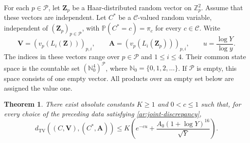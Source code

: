 \documentclass[twoside]{aomart}
\theoremstyle{paperplain}
\newtheorem{theorem}{Theorem}[section]
\theoremstyle{paperdefinition}
\newcommand{\Z}{\mathbb Z}
\newcommand{\N}{\mathbb N}
\newcommand{\Pp}{\mathbb P}
\newcommand{\TV}{d_{\mathrm{TV}}}
\numberwithin{equation}{section}
\begin{document}
For each $p\in\mathcal P$, let $\mathbf Z_p$ be a
Haar-distributed random vector on $\Z_p^2$.
Assume that these vectors are independent.
Let $C^*$ be a $\mathcal C$-valued random variable, independent
of $(\mathbf Z_p)_{p\in\mathcal P}$, with
$\Pp(C^*=c)=\pi_c$ for every $c\in\mathcal C$.
Write
\begin{equation*}
 \mathbf V=(v_p(L_i(\mathbf Z)))_{p,i},\qquad
 \mathbf A=(v_p(L_i(\mathbf Z_p)))_{p,i},\qquad
 u=\frac{\log Y}{\log y}.
\end{equation*}
The indices in these vectors range over $p\in\mathcal P$
and $1\le i\le4$. Their common state space is the countable
set $(\N_0^4)^{\mathcal P}$, where
$\N_0=\{0,1,2,\ldots\}$. If $\mathcal P$ is empty, this
space consists of one empty vector. All products over an
empty set below are assigned the value one.
\begin{samepage}
\begin{theorem}
\label{ar:joint-valuation-approximation}
There exist absolute constants $K\ge1$ and $0<c\le1$ such that,
for every choice of the preceding data satisfying
\eqref{ar:joint-discrepancy},
\begin{equation*}
 \TV((C,\mathbf V),(C^*,\mathbf A))
 \le K\left(e^{-cu}+\frac{A_0(1+\log Y)^{16}}{\sqrt Y}\right).
\end{equation*}
\end{theorem}
\end{samepage}
\end{document}

